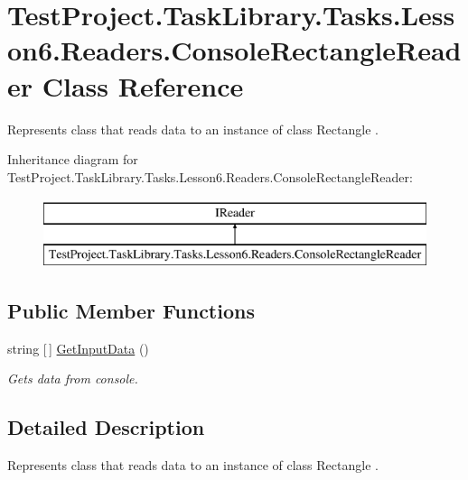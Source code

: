 \hypertarget{class_test_project_1_1_task_library_1_1_tasks_1_1_lesson6_1_1_readers_1_1_console_rectangle_reader}{}\section{Test\+Project.\+Task\+Library.\+Tasks.\+Lesson6.\+Readers.\+Console\+Rectangle\+Reader Class Reference}
\label{class_test_project_1_1_task_library_1_1_tasks_1_1_lesson6_1_1_readers_1_1_console_rectangle_reader}


Represents class that reads data to an instance of class Rectangle .  


Inheritance diagram for Test\+Project.\+Task\+Library.\+Tasks.\+Lesson6.\+Readers.\+Console\+Rectangle\+Reader\+:\begin{figure}[H]
\begin{center}
\leavevmode
\includegraphics[height=2.000000cm]{class_test_project_1_1_task_library_1_1_tasks_1_1_lesson6_1_1_readers_1_1_console_rectangle_reader}
\end{center}
\end{figure}
\subsection*{Public Member Functions}
\begin{DoxyCompactItemize}
\item 
string \mbox{[}$\,$\mbox{]} \mbox{\hyperlink{class_test_project_1_1_task_library_1_1_tasks_1_1_lesson6_1_1_readers_1_1_console_rectangle_reader_a1d25f81281ba9861388154f7369c4e8e}{Get\+Input\+Data}} ()
\begin{DoxyCompactList}\small\item\em Gets data from console. \end{DoxyCompactList}\end{DoxyCompactItemize}


\subsection{Detailed Description}
Represents class that reads data to an instance of class Rectangle . 



